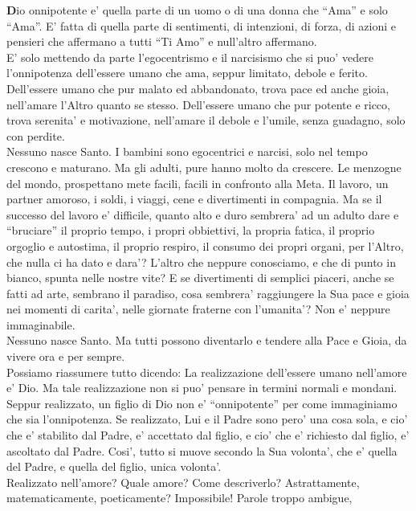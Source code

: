 \textbf{D}io onnipotente e' quella parte di un uomo o di una donna che ``Ama'' e solo ``Ama''.
E' fatta di quella parte di sentimenti, di intenzioni, di forza, di azioni e pensieri che affermano a tutti ``Ti Amo'' e null'altro affermano.\\
E' solo mettendo da parte l'egocentrismo e il narcisismo che si puo' vedere l'onnipotenza dell'essere umano che ama, seppur limitato, debole e ferito.  Dell'essere umano che pur malato ed abbandonato, trova pace ed anche gioia, nell'amare l'Altro quanto se stesso.  Dell'essere umano che pur potente e ricco, trova serenita' e motivazione, nell'amare il debole e l'umile, senza guadagno, solo con perdite.\\
Nessuno nasce Santo. I bambini sono egocentrici e narcisi,
solo nel tempo crescono e maturano.
Ma gli adulti, pure hanno molto da crescere. Le menzogne del
mondo, prospettano mete facili, facili in confronto alla Meta.
Il lavoro, un partner amoroso, i soldi, i viaggi,
cene e divertimenti in compagnia. 
Ma se il successo del lavoro e' difficile,
quanto alto e duro sembrera' ad un adulto dare e ``bruciare''
il proprio tempo, i propri obbiettivi, la propria fatica,
il proprio orgoglio e autostima, il proprio respiro,
il consumo dei propri organi, per l'Altro, che nulla ci ha dato
e dara'? L'altro che neppure conosciamo, e che di punto in bianco,
spunta nelle nostre vite?
E se divertimenti di semplici piaceri, anche se fatti ad arte,
sembrano il paradiso, cosa sembrera' raggiungere la Sua pace e 
gioia nei momenti di carita', nelle giornate fraterne con l'umanita'?
Non e' neppure immaginabile.\\
Nessuno nasce Santo. Ma tutti possono diventarlo e tendere alla
Pace e Gioia, da vivere ora e per sempre.
\\
Possiamo riassumere tutto dicendo:
La realizzazione dell'essere umano nell'amore e' Dio. Ma tale realizzazione non si puo'
pensare in termini normali e mondani.
Seppur realizzato, un figlio di Dio non e' ``onnipotente'' per come
immaginiamo che sia l'onnipotenza.
Se realizzato, Lui e il Padre sono pero' una cosa sola, 
e cio' che e' stabilito dal Padre, e' accettato dal figlio,
e cio' che e' richiesto dal figlio, e' ascoltato dal Padre.
Cosi', tutto si muove secondo la Sua volonta', che e' quella del Padre,
e quella del figlio, unica volonta'.
\\
Realizzato nell'amore? Quale amore?
Come descriverlo?
Astrattamente, matematicamente, poeticamente?
Impossibile! Parole troppo ambigue, 
